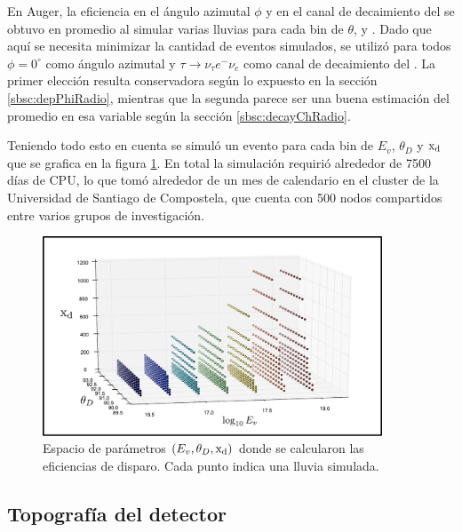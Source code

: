 	En Auger, la eficiencia en el \'angulo azimutal $\phi$ y en el canal de decaimiento del \tauon{} se obtuvo en promedio al simular varias lluvias para cada bin de $\theta$, \xd{} y \etau{}.
	Dado que aqu\'i se necesita minimizar la cantidad de eventos simulados, se utiliz\'o para todos $\phi=0^\circ$ como \'angulo azimutal y $\tau\rightarrow\nu_\tau e^-\nu_e$ como canal de decaimiento del \tauon{}.
	La primer elecci\'on resulta conservadora seg\'un lo expuesto en la secci\'on \ref{sbsc:depPhiRadio}, mientras que la segunda parece ser una buena estimaci\'on del promedio en esa variable seg\'un la secci\'on \ref{sbsc:decayChRadio}.
	
	Teniendo todo esto en cuenta se simul\'o un evento para cada bin de $E_v$, $\theta_D$ y ${\rm x_d}$ que se grafica en la figura \ref{fig:binesRadio}.
	En total la simulaci\'on requiri\'o alrededor de 7500 d\'ias de CPU, lo que tom\'o alrededor de un mes de calendario en el cluster de la Universidad de Santiago de Compostela, que cuenta con 500 nodos compartidos entre varios grupos de investigaci\'on. 
	\begin{figure}[h!]
		\begin{center}
			\includegraphics[width=0.9\textwidth]{fig/resultadosRadio/binesRadio_3}
			\caption{\label{fig:binesRadio} Espacio de par\'ametros $(E_v,\theta_D,{\rm x_d})$ donde se calcularon las eficiencias de disparo. Cada punto indica una lluvia simulada.
			}
		\end{center}
	\end{figure}
	
	\subsection{Topograf\'ia del detector}
	
